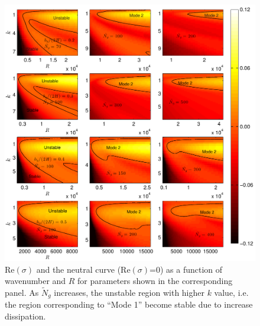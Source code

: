 \documentclass[12pt]{report}   %
\newcommand{\Rey}{{R}}
\newcommand{\Ndg}{\tilde{N}_g}
\begin{document}
\begin{figure}
\centerline{ \includegraphics{IsotropicDragAll_imgsc4} }
\caption{
$\text{Re}(\sigma)$ and the neutral curve ($\text{Re}(\sigma)$=0) as a function of wavenumber and $\Rey$ for parameters shown in the corresponding panel.  
As $\Ndg$ increases, the unstable region with higher $k$ value, i.e. the region corresponding to ``Mode 1'' become stable due to increase dissipation.
}
\label{K_Re_sigma_set3}
\end{figure}
\end{document}
